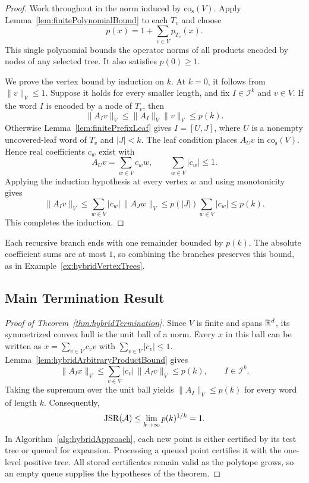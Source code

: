 \begin{proof}
    Work throughout in the norm induced by $\mathrm{co}_{\mathrm{s}}(V)$.
    Apply Lemma~\ref{lem:finitePolynomialBound} to each $T_v$ and choose
    \[
        p(x)=1+\sum_{v\in V}p_{T_v}(x).
    \]
    This single polynomial bounds the operator norms of all products encoded by nodes of any selected tree.
    It also satisfies $p(0)\geq1$.

    We prove the vertex bound by induction on $k$.
    At $k=0$, it follows from $\lVert v\rVert_V\leq1$.
    Suppose it holds for every smaller length, and fix $I\in\mathcal{I}^k$ and $v\in V$.
    If the word $I$ is encoded by a node of $T_v$, then
    \[
        \lVert A_Iv\rVert_V\leq\lVert A_I\rVert_V\lVert v\rVert_V\leq p(k).
    \]
    Otherwise Lemma~\ref{lem:finitePrefixLeaf} gives $I=[U,J]$, where $U$ is a nonempty uncovered-leaf word of $T_v$ and $|J|<k$.
    The leaf condition places $A_Uv$ in $\mathrm{co}_{\mathrm{s}}(V)$.
    Hence real coefficients $c_w$ exist with
    \[
        A_Uv=\sum_{w\in V}c_ww,\qquad\sum_{w\in V}|c_w|\leq1.
    \]
    Applying the induction hypothesis at every vertex $w$ and using monotonicity gives
    \[
        \lVert A_Iv\rVert_V
        \leq\sum_{w\in V}|c_w|\,\lVert A_Jw\rVert_V
        \leq p(|J|)\sum_{w\in V}|c_w|
        \leq p(k).
    \]
    This completes the induction.
\end{proof}

Each recursive branch ends with one remainder bounded by $p(k)$.
The absolute coefficient sums are at most $1$, so combining the branches preserves this bound, as in Example~\ref{ex:hybridVertexTrees}.

\subsection{Main Termination Result}

\begin{proof}[Proof of Theorem~\ref{thm:hybridTermination}]
    Since $V$ is finite and spans $\mathbb{R}^d$, its symmetrized convex hull is the unit ball of a norm.
    Every $x$ in this ball can be written as $x=\sum_{v\in V}c_vv$ with $\sum_{v\in V}|c_v|\leq1$.
    Lemma~\ref{lem:hybridArbitraryProductBound} gives
    \[
        \lVert A_Ix\rVert_V
        \leq\sum_{v\in V}|c_v|\,\lVert A_Iv\rVert_V
        \leq p(k),\qquad I\in\mathcal{I}^k.
    \]
    Taking the supremum over the unit ball yields $\lVert A_I\rVert_V\leq p(k)$ for every word of length $k$.
    Consequently,
    \[
        \operatorname{JSR}(\mathcal{A})\leq\lim_{k\to\infty}p(k)^{1/k}=1.
    \]
    In Algorithm~\ref{alg:hybridApproach}, each new point is either certified by its test tree or queued for expansion.
    Processing a queued point certifies it with the one-level positive tree.
    All stored certificates remain valid as the polytope grows, so an empty queue supplies the hypotheses of the theorem.
\end{proof}

